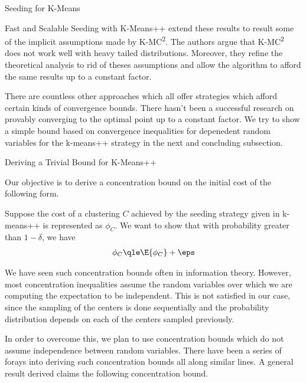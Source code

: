 \documentclass[10pt]{article}
\begin{document}
\begin{psection}{Seeding for K-Means}
\begin{psubsection}{Fast and Scalable Seeding with K-Means++}
        \citet{fast-kmeanspp} extend these results to result some of the implicit
        assumptions made by K-MC\textsuperscript{2}. The authors argue that
        K-MC\textsuperscript{2} does not work well with heavy tailed distributions.
        Moreover, they refine the theoretical analysis to rid of theses assumptions and
        allow the algorithm to afford the same results up to a constant factor.

        There are countless other approaches which all offer strategies which afford
        certain kinds of convergence bounds. There hasn't been a successful research
        on provably converging to the optimal point up to a constant factor. We try
        to show a simple bound based on convergence inequalities for depenedent
        random variables for the k-means++ strategy in the next and concluding
        subsection.
    
    \end{psubsection}

    \begin{psubsection}{Deriving a Trivial Bound for K-Means++}
        
        Our objective is to derive a concentration bound on the initial cost of the
        following form.

        Suppose the cost of a clustering $C$ achieved by the seeding strategy given in
        k-means++ is represented as $\phi_C$. We want to show that with probability greater
        than $1 - \delta$, we have
        \begin{align*}
            \phi_C \qle \E{\phi_C} + \eps
        \end{align*}

        We have seen such concentration bounds often in information theory. However, most
        concentration inequalities assume the random variables over which we are computing
        the expectation to be independent. This is not satisfied in our case, since the
        sampling of the centers is done sequentially and the probability distribution
        depends on each of the centers sampled previously.

        In order to overcome this, we plan to use concentration bounds which do not assume
        independence between random variables. There have been a series of forays into
        deriving such concentration bounds \citep{marton1, marton2, samson, kontor, paulin}
        all along similar lines. A general result derived \citep{kontor} claims the
        following concentration bound.


\end{psubsection}
\end{psection}
\end{document}
